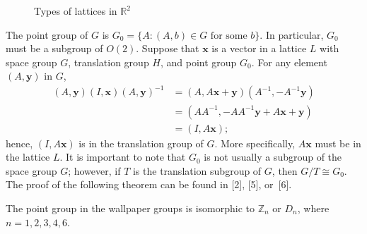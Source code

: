 \begin{figure}[bht]
\begin{center}
\end{center}
\caption{Types of lattices in  ${\mathbb R}^2$}
\label{Types}
\end{figure}
 
 
The point group of $G$ is $G_0 = \{A : (A,b) \in G \text{ for some }
b \}$. In particular, $G_0$ must be a subgroup of $O(2)$. Suppose
that ${\mathbf x}$ is a vector in a lattice $L$ with space group $G$,
translation group $H$, and point group $G_0$. For any element $(A,
{\mathbf y})$ in $G$,   
\begin{align*}
(A, {\mathbf y}) (I, {\mathbf x}) (A, {\mathbf y})^{-1}
& =
(A,A {\mathbf x} + {\mathbf y}) (A^{-1},-A^{-1} {\mathbf y}) \\
& =
(A A^{-1},-A A^{-1} {\mathbf y} + A {\mathbf x} + {\mathbf y}) \\
& =
(I, A {\mathbf x});
\end{align*}
hence, $(I, A {\mathbf x})$ is in the translation group of $G$. More
specifically, $A {\mathbf x}$ must be in the lattice $L$. It is
important to note that $G_0$ is not usually a subgroup of the space
group $G$; however, if $T$ is the translation subgroup of $G$, then
$G/T \cong G_0$. The proof of the following theorem can be found in
[2], [5], or~[6].
 
 
 
\begin{theorem}
The point group in the wallpaper groups is isomorphic to ${\mathbb Z}_n$
or $D_n$, where $n = 1, 2, 3, 4, 6$. 
\end{theorem}
 
